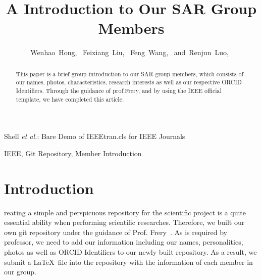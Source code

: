 \documentclass[journal]{IEEEtran}
\begin{document}
\title{A Introduction to Our SAR Group Members}

\author{Wenhao~Hong,~
        Feixiang~Liu,~
        Feng~Wang,~
        and~Renjun~Luo,~%
}


%
{Shell \MakeLowercase{\textit{et al.}}: Bare Demo of IEEEtran.cls for IEEE Journals}




\maketitle

\begin{abstract}
	This paper is a brief group introduction to our SAR group members, which consists of our names, photos, chacacteristics, research interests as well as our respective ORCID Identifiers. Through the guidance of prof.Frery, and by using the IEEE official template, we have completed this article.
\end{abstract}

\begin{IEEEkeywords}
IEEE, Git Repository, Member Introduction
\end{IEEEkeywords}




\IEEEpeerreviewmaketitle



\section{Introduction}


reating a simple and perspicuous repository for the scientific project is a quite essential ability when performing scientific researches. Therefore, we built our own git repository under the guidance of Prof. Frery~\cite{2020A}.
As is required by professor, we need to add our information including our names, personalities, photos as well as ORCID Identifiers to our newly built repository.
As a result, we submit a \LaTeX\ file into the repository with the information of each member in our group.
\end{document}
